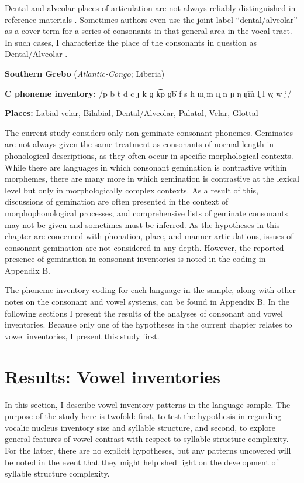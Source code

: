   Dental and alveolar places of articulation are not always reliably distinguished in reference materials \citep[31-32]{Maddieson1984}. Sometimes authors even use the joint label ``dental/alveolar'' as a cover term for a series of consonants in that general area in the vocal tract. In such cases, I characterize the place of the consonants in question as Dental/Alveolar .

\ea\label{ex:4.11}
  \textbf{Southern Grebo} (\textit{Atlantic-Congo}; Liberia)

\textbf{C phoneme inventory:} /p b t d c ɟ k ɡ k͡p ɡ͡b f s h m̥ m n̥ n ɲ ŋ ŋ͡m l̥ l w̥ w j/

\textbf{Places:} Labial-velar, Bilabial, Dental/Alveolar, Palatal, Velar, Glottal
\z

  The current study considers only non-geminate consonant phonemes. Geminates are not always given the same treatment as consonants of normal length in phonological descriptions, as they often occur in specific morphological contexts. While there are languages in which consonant gemination is contrastive within morphemes, there are many more in which gemination is contrastive at the lexical level but only in morphologically complex contexts. As a result of this, discussions of gemination are often presented in the context of morphophonological processes, and comprehensive lists of geminate consonants may not be given and sometimes must be inferred. As the hypotheses in this chapter are concerned with phonation, place, and manner articulations, issues of consonant gemination are not considered in any depth. However, the reported presence of gemination in consonant inventories is noted in the coding in Appendix B.

  The phoneme inventory coding for each language in the sample, along with other notes on the consonant and vowel systems, can be found in Appendix B. In the following sections I present the results of the analyses of consonant and vowel inventories. Because only one of the hypotheses in the current chapter relates to vowel inventories, I present this study first.

\section{Results: Vowel inventories}\label{sec:4.3}

  In this section, I describe vowel inventory patterns in the language sample. The purpose of the study here is twofold: first, to test the hypothesis in  regarding vocalic nucleus inventory size and syllable structure, and second, to explore general features of vowel contrast with respect to syllable structure complexity. For the latter, there are no explicit hypotheses, but any patterns uncovered will be noted in the event that they might help shed light on the development of syllable structure complexity.

